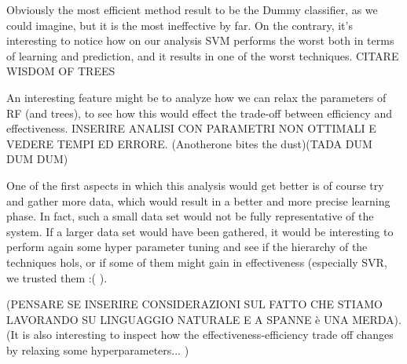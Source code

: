 \documentclass{article}
\begin{document}
Obviously the most efficient method result to be the Dummy classifier, as we could imagine, but it is the most ineffective by far.
On the contrary, it's interesting to notice how on our analysis SVM performs the worst both in terms of learning and prediction, and it results in one of the worst techniques.
CITARE WISDOM OF TREES

An interesting feature might be to analyze how we can relax the parameters of RF (and trees), to see how this would effect the trade-off between efficiency and effectiveness.
INSERIRE ANALISI CON PARAMETRI NON OTTIMALI E VEDERE TEMPI ED ERRORE.
(Anotherone bites the dust)(TADA DUM    DUM    DUM)

One of the first aspects in which this analysis would get better is of course try and gather more data, which would result in a better and more precise learning phase. In fact, such a small data set would not be fully representative of the system.
If a larger data set would have been gathered, it would be interesting to perform again some hyper parameter tuning and see if the hierarchy of the techniques hols, or if some of them might gain in effectiveness (especially SVR, we trusted them :( ).

(PENSARE SE INSERIRE CONSIDERAZIONI SUL FATTO CHE STIAMO LAVORANDO SU LINGUAGGIO NATURALE E A SPANNE è UNA MERDA).
(It is also interesting to inspect how the effectiveness-efficiency trade off changes by relaxing some hyperparameters... )
\cite{slides}

\newpage


\end{document}
